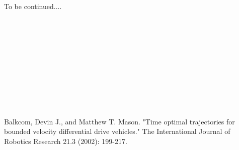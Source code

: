 \documentclass[12pt]{article}
\begin{document}
  
  To be continued....\\
  \\
  \\
  \\
  \\
  \\
  \\
  \\
  \\
  \\
  \\
  
  
  
  
  \begin{thebibliography}{1}

   Balkcom, Devin J., and Matthew T. Mason. "Time optimal trajectories for bounded velocity differential drive vehicles." The International Journal of Robotics Research 21.3 (2002): 199-217.

  \end{thebibliography}
  
\end{document}

